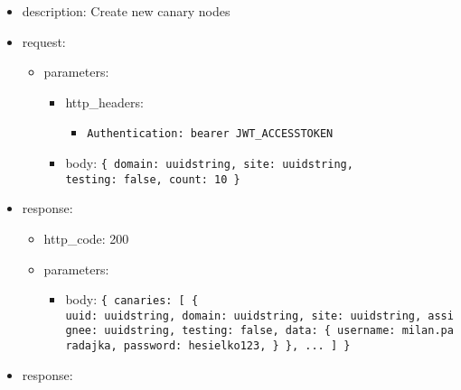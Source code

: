\documentclass[
]{article}
\begin{document}
\begin{itemize}
\item
  description: Create new canary nodes
\item
  request:

  \begin{itemize}
  \item
    parameters:

    \begin{itemize}
    \item
      http\_headers:

      \begin{itemize}
      \item
        \texttt{Authentication:\ \textquotesingle{}bearer\ JWT\_ACCESSTOKEN\textquotesingle{}}
      \end{itemize}
    \item
      body: \texttt{\{
      \textquotesingle{}domain\textquotesingle{}:\ \textquotesingle{}uuidstring\textquotesingle{},
      \textquotesingle{}site\textquotesingle{}:\ \textquotesingle{}uuidstring\textquotesingle{},
      \textquotesingle{}testing\textquotesingle{}:\ false,
      \textquotesingle{}count\textquotesingle{}:\ 10
      \}}
    \end{itemize}
  \end{itemize}
\item
  response:

  \begin{itemize}
  \item
    http\_code: 200
  \item
    parameters:

    \begin{itemize}
    \item
      body: \texttt{\{
      \textquotesingle{}canaries\textquotesingle{}:\ {[}
      	\{
      		\textquotesingle{}uuid\textquotesingle{}:\ \textquotesingle{}uuidstring\textquotesingle{},\ 
      		\textquotesingle{}domain\textquotesingle{}:\ \textquotesingle{}uuidstring\textquotesingle{},\ 
      		\textquotesingle{}site\textquotesingle{}:\ \textquotesingle{}uuidstring\textquotesingle{},\ 
      		\textquotesingle{}assignee\textquotesingle{}:\ \textquotesingle{}uuidstring\textquotesingle{},\ 
      		\textquotesingle{}testing\textquotesingle{}:\ false,\ 
      		\textquotesingle{}data\textquotesingle{}:\ \{\ 
      			\textquotesingle{}username\textquotesingle{}:\ \textquotesingle{}milan.paradajka\textquotesingle{},\ 
      			\textquotesingle{}password\textquotesingle{}:\ \textquotesingle{}hesielko123\textquotesingle{},\ 
      		\}\ 
      	\},
      	...\ 
      {]}
      \}}
    \end{itemize}
  \end{itemize}
\item
  response:


\end{itemize}
\end{document}
